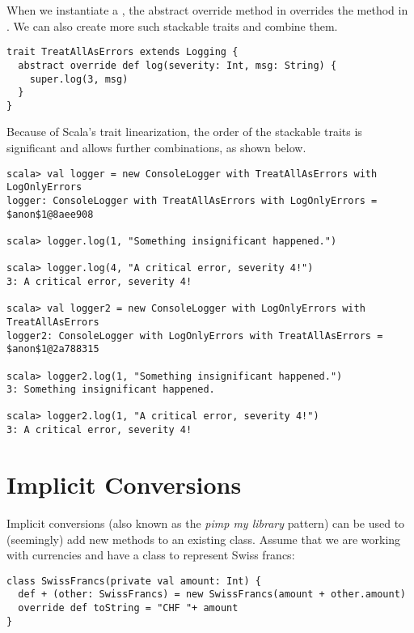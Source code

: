 When we instantiate a , the abstract override method in  overrides the  method in . We can also create more such stackable traits and combine them.

\begin{lstlisting}
trait TreatAllAsErrors extends Logging {
  abstract override def log(severity: Int, msg: String) {
    super.log(3, msg)
  }
}
\end{lstlisting}

Because of Scala's trait linearization, the order of the stackable traits is significant and allows further combinations, as shown below.

\begin{lstlisting}
scala> val logger = new ConsoleLogger with TreatAllAsErrors with LogOnlyErrors  
logger: ConsoleLogger with TreatAllAsErrors with LogOnlyErrors = $anon$1@8aee908

scala> logger.log(1, "Something insignificant happened.")

scala> logger.log(4, "A critical error, severity 4!")
3: A critical error, severity 4!

scala> val logger2 = new ConsoleLogger with LogOnlyErrors with TreatAllAsErrors
logger2: ConsoleLogger with LogOnlyErrors with TreatAllAsErrors = $anon$1@2a788315

scala> logger2.log(1, "Something insignificant happened.")
3: Something insignificant happened.

scala> logger2.log(1, "A critical error, severity 4!")
3: A critical error, severity 4!
\end{lstlisting}

\section{Implicit Conversions} \label{section:implicit-conversions}

Implicit conversions (also known as the \textit{pimp my library} pattern) can be used to (seemingly) add new methods to an existing class. Assume that we are working with currencies and have a class to represent Swiss francs:

\begin{lstlisting}
class SwissFrancs(private val amount: Int) {
  def + (other: SwissFrancs) = new SwissFrancs(amount + other.amount)
  override def toString = "CHF "+ amount
}
\end{lstlisting}

